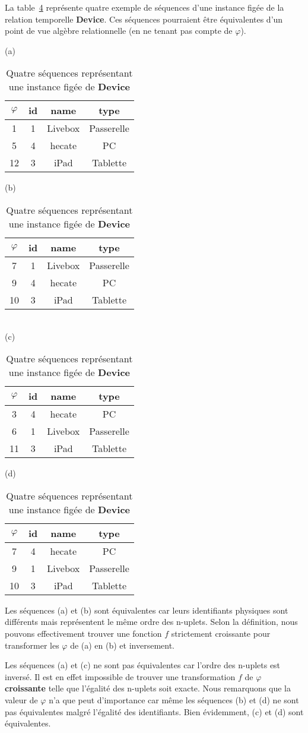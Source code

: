 \begin{example}
La table~\ref{tab:contrib:astral:exequivalence} représente quatre exemple de séquences d'une instance figée de la relation temporelle \textbf{Device}. Ces séquences pourraient être équivalentes d'un point de vue algèbre relationnelle (en ne tenant pas compte de $\varphi$).

\begin{table}[ht]
\centering
(a)
\begin{tabular}{c|ccc} 
      $\varphi$ & id & name & type \\ \hline 
       1  & 1 & Livebox & Passerelle \\
       5  & 4 & hecate & PC\\
       12 & 3 & iPad & Tablette\\
\end{tabular}
\hspace{1cm}
(b)
\begin{tabular}{c|ccc} 
      $\varphi$ & id & name & type \\ \hline 
       7  & 1 & Livebox & Passerelle \\
       9  & 4 & hecate & PC\\
       10 & 3 & iPad & Tablette\\
\end{tabular}\\
(c)
\begin{tabular}{c|ccc} 
      $\varphi$ & id & name & type \\ \hline 
       3  & 4 & hecate & PC\\
       6  & 1 & Livebox & Passerelle \\
       11 & 3 & iPad & Tablette\\
\end{tabular}
\hspace{1cm}
(d)
\begin{tabular}{c|ccc} 
      $\varphi$ & id & name & type \\ \hline 
       7  & 4 & hecate & PC\\
       9  & 1 & Livebox & Passerelle \\
       10 & 3 & iPad & Tablette\\
\end{tabular}
\caption{Quatre séquences représentant une instance figée de \textbf{Device}}\label{tab:contrib:astral:exequivalence}
\end{table}

Les séquences (a) et (b) sont équivalentes car leurs identifiants physiques sont différents mais représentent le même ordre des n-uplets. Selon la définition, nous pouvons effectivement trouver une fonction $f$ strictement croissante pour transformer les $\varphi$ de (a) en (b) et inversement. 

Les séquences (a) et (c) ne sont pas équivalentes car l'ordre des n-uplets est inversé. Il est en effet impossible de trouver une transformation $f$ de $\varphi$ \textbf{croissante} telle que l'égalité des n-uplets soit exacte. Nous remarquons que la valeur de $\varphi$ n'a que peut d'importance car même les séquences (b) et (d) ne sont pas équivalentes malgré l'égalité des identifiants. Bien évidemment, (c) et (d) sont équivalentes.
\end{example}

